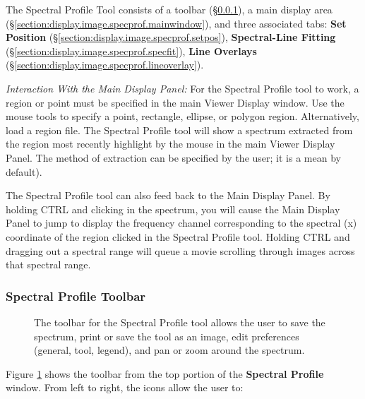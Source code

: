 The Spectral Profile Tool consists of a toolbar (\S \ref{section:display.image.specprof.toolbar}),
a main display area (\S \ref{section:display.image.specprof.mainwindow}), and three associated tabs:
{\bf Set Position} (\S \ref{section:display.image.specprof.setpos}), 
{\bf Spectral-Line Fitting} (\S \ref{section:display.image.specprof.specfit}), 
{\bf Line Overlays} (\S \ref{section:display.image.specprof.lineoverlay}).

{\em Interaction With the Main Display Panel:} For the Spectral Profile tool to work, a region or point
must be specified in the main Viewer Display window. Use the mouse tools to specify a point, 
rectangle, ellipse, or polygon region. Alternatively, load a region file. The Spectral Profile tool will show 
a spectrum extracted from the region most recently highlight by the mouse in the main Viewer Display Panel.
The method of extraction can be specified by the user; it is a mean by default).

The Spectral Profile tool can also feed back to the Main Display Panel. By holding CTRL and clicking
in the spectrum, you will cause the Main Display Panel to jump to display the frequency channel corresponding
to the spectral (x) coordinate of the region clicked in the Spectral Profile tool. Holding CTRL and dragging out
a spectral range will queue a movie scrolling through images across that spectral range.

\subsubsection{Spectral Profile Toolbar}
\label{section:display.image.specprof.toolbar}

\begin{figure}[h!]
\begin{center}
\caption{\label{fig:viewer_spectoolbar} The toolbar for the Spectral Profile tool allows the user to
save the spectrum, print or save the tool as an image, edit preferences (general, tool, legend), and
pan or zoom around the spectrum.}
\hrulefill
\end{center}
\end{figure}

Figure \ref{fig:viewer_spectoolbar} shows the toolbar from the top portion of the {\bf Spectral Profile} 
window. From left to right, the icons allow the user to:

